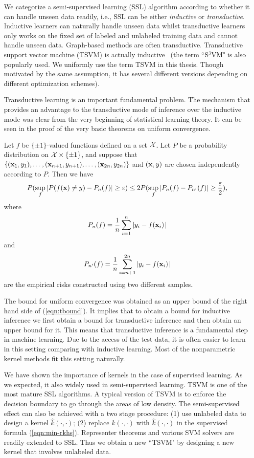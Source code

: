 We categorize a semi-supervised learning (SSL) algorithm according to whether it can handle unseen data readily, i.e., SSL can be either {\em inductive} or {\em transductive}. Inductive learners can naturally handle unseen data whilst transductive learners only works on the fixed set of labeled and unlabeled training data and cannot handle unseen data. Graph-based methods are often transductive. Transductive support vector machine (TSVM) is actually inductive~\cite{Vapnik98,jmlr/ChapelleSK08,jmlr/CollobertSWB06} (the term ``S$^3$VM" is also popularly used. We uniformly use the term TSVM in this thesis. Though motivated by the same assumption, it has several different versions depending on different optimization schemes).

Transductive learning is an important fundamental problem. The mechanism that provides an advantage to the transductive mode of inference over the inductive mode was clear from the very beginning of statistical learning theory. It can be seen in the proof of the very basic theorems on uniform convergence.
\begin{theorem}
Let $f$ be $\{\pm1\}$-valued functions defined on a set ${\cal X}$. Let $P$ be a probability distribution on ${\cal X}\times\{\pm1\}$, and suppose that $\{(\mathbf{x}_1, y_1),\ldots,(\mathbf{x}_{n+1},y_{n+1}),\ldots,(\mathbf{x}_{2n}, y_{2n})\}$ and $(\mathbf{x},y)$ are chosen independently according to $P$. Then we have
\begin{equation}
P(\sup_f|P(f(\x)\neq y)-P_n(f)|\geq\varepsilon)\leq2P(\sup_f|P_n(f)-P_{n'}(f)|\geq\frac{\varepsilon}{2}),
\label{eqn:tbound}
\end{equation}
where
\[
P_n(f)=\frac{1}{n}\sum_{i=1}^n|y_i-f(\mathbf{x}_i)|
\]
and
\[
P_{n'}(f)=\frac{1}{n}\sum_{i=n+1}^{2n}|y_i-f(\mathbf{x}_i)|
\]
are the empirical risks constructed using two different samples.
\end{theorem}
The bound for uniform convergence was obtained as an upper bound of the right hand side of (\ref{eqn:tbound}). It implies that to obtain a bound for inductive inference we first obtain a bound for transductive inference and then obtain an upper bound for it. This means that transductive inference is a fundamental step in machine learning. Due to the access of the test data, it is often easier to learn in this setting comparing with inductive learning. Most of the nonparametric kernel methods fit this setting naturally.

We have shown the importance of kernels in the case of supervised learning. As we expected, it also widely used in semi-supervised learning. TSVM\cite{jmlr/CollobertSWB06} is one of the most mature SSL algorithms. A typical  version of TSVM is to enforce the decision boundary to go through the areas of low density. The semi-supervised effect can also be achieved with a two stage procedure: (1) use unlabeled data to design a kernel $\hat{k}(\cdot,\cdot)$; (2) replace $k(\cdot,\cdot)$ with $\hat{k}(\cdot,\cdot)$ in the supervised formula (\ref{eqn:min-rkhs}). Representer theorems and various SVM solvers are readily extended to SSL. Thus we obtain a new ``TSVM" by designing a new kernel that involves unlabeled data.

